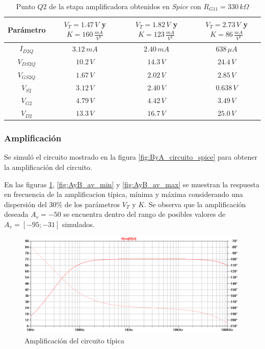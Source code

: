 \documentclass[10pt,spanish,a4paper,notitlepage]{article}
\begin{document}
\begin{table}[H]
\centering
\begin{tabular}{|c|c|c|c|} 
\hline
Parámetro & $V_{T}=1.47\,\unit{V}$ y $K=160\,\unit{\frac{mA}{V^2}}$ & 
$V_{T}=1.82\,\unit{V}$ y $K=123\,\unit{\frac{mA}{V^2}}$ &
$V_{T}=2.73\,\unit{V}$ y $K=86\,\unit{\frac{mA}{V^2}}$ \\ \hline
$I_{D2Q}$ & $3.12\,\unit{mA}$ & $2.40\,\unit{mA}$ & $638\,\unit{\mu A}$\\ \hline
$V_{DS2Q}$ & $10.2\,\unit{V}$ & $14.3\,\unit{V}$ & $24.4\,\unit{V}$\\ \hline
$V_{GS2Q}$ & $1.67\,\unit{V}$  & $2.02\,\unit{V}$ & $2.85\,\unit{V}$\\
\hline
$V_{S2}$ & $3.12\,\unit{V}$  & $2.40\,\unit{V}$ & $0.638\,\unit{V}$\\ \hline
$V_{G2}$ & $4.79\,\unit{V}$  & $4.42\,\unit{V}$ & $3.49\,\unit{V}$\\ \hline
$V_{D2}$ & $13.3\,\unit{V}$  & $16.7\,\unit{V}$ & $25.0\,\unit{V}$\\ \hline
\end{tabular}
\caption{Punto $Q2$ de la etapa amplificadora obtenidos en \emph{Spice} con $R_{G11} = 330\,\unit{k\Omega}$}
\label{table:B_amplificador_modificado}
\end{table}



\subsubsection{Amplificación}

Se simuló el circuito mostrado en la figura \ref{fig:ByA_circuito_spice} para
obtener la amplificación del circuito.

En las figuras \ref{fig:AyB_av_tipico}, \ref{fig:AyB_av_min} y \ref{fig:AyB_av_max} 
se muestran la respuesta en frecuencia de la amplificacion típica, mínima y máxima considerando una dispersión
del 30\% de los parámetros $V_T$ y $K$.
Se observa que la amplificación deseada $A_v = -50$ se encuentra dentro del 
rango de posibles valores de $A_v = [-95;-31]$ simulados.

\begin{figure}[H]
\centering
\includegraphics[scale=0.5]{simulaciones/B_av_tipica.png}
\caption{Amplificación del circuito típica}
\label{fig:AyB_av_tipico}
\end{figure}
\end{document}

